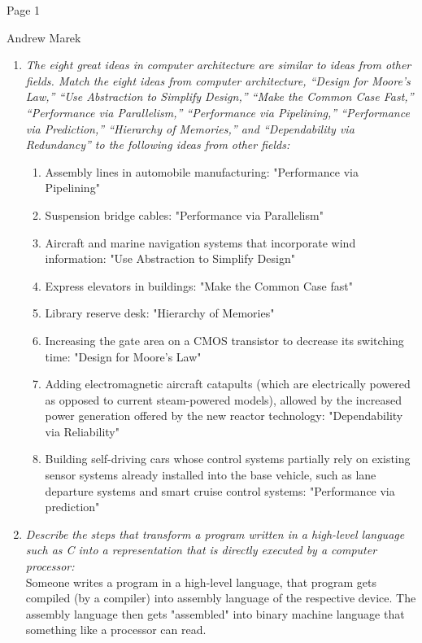 \documentclass{article}
\begin{document}
\large
\large Page 1
\begin{center}
{\Large Andrew Marek}
\end{center}
\vspace{0.05in}

\begin{enumerate}
\item \textit{The eight great ideas in computer architecture are similar to ideas from other fields. Match the eight ideas from computer architecture, “Design for Moore’s Law,” “Use Abstraction to Simplify Design,” “Make the Common Case Fast,” “Performance via Parallelism,” “Performance via Pipelining,” “Performance via Prediction,” “Hierarchy of Memories,” and “Dependability via Redundancy” to the following ideas from other fields:}
\begin{enumerate}
    \item Assembly lines in automobile manufacturing: "Performance via Pipelining"
    \item Suspension bridge cables: "Performance via Parallelism"
    \item Aircraft and marine navigation systems that incorporate wind information: "Use Abstraction to Simplify Design"
    \item Express elevators in buildings: "Make the Common Case fast"
    \item Library reserve desk: "Hierarchy of Memories"
    \item Increasing the gate area on a CMOS transistor to decrease its switching time: "Design for Moore's Law"
    \item Adding electromagnetic aircraft catapults (which are electrically powered as opposed to current steam-powered models), allowed by the increased power generation offered by the new reactor technology: "Dependability via Reliability"
    \item Building self-driving cars whose control systems partially rely on existing sensor systems already installed into the base vehicle, such as lane departure systems and smart cruise control systems: "Performance via prediction"
\end{enumerate}
\item \textit{Describe the steps that transform a program written in a high-level language such as C into a representation that is directly executed by a computer processor:}\\ Someone writes a program in a high-level language, that program gets compiled (by a compiler) into assembly language of the respective device.  The assembly language then gets "assembled" into binary machine language that something like a processor can read.


\end{enumerate}
\end{document}
